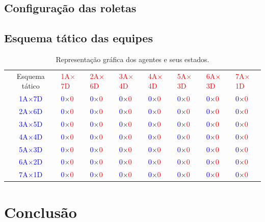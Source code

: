 \documentclass[preprint,12pt]{elsarticle}
\newcommand{\red}[1]{\textcolor{red}{#1}}
\newcommand{\blu}[1]{\textcolor{blue}{#1}}
\newcommand{\score}[2]{\blu{#1}$\times$\red{#2}}
\begin{document}
\subsection{Configuração das roletas}
\label{subsec:direcao_roletas}

\subsection{Esquema tático das equipes}
\label{subsec:esquema_tatico}

\begin{table}[H]
	\begin{center}
		\begin{tabular}{cp{1.15cm}p{1.15cm}p{1.15cm}p{1.15cm}p{1.15cm}p{1.15cm}p{1.15cm}}
			\toprule
			Esquema tático & \red{1A$\times$7D}  & \red{2A$\times$6D}  & \red{3A$\times$4D}  & \red{4A$\times$4D}  & \red{5A$\times$3D}  & \red{6A$\times$3D}  & \red{7A$\times$1D}\\
			\cmidrule(r){1-8}
			\blu{1A$\times$7D}    & \score{0}{0} & \score{0}{0} & \score{0}{0} & \score{0}{0} & \score{0}{0} & \score{0}{0} & \score{0}{0} \\
			\blu{2A$\times$6D}    & \score{0}{0} & \score{0}{0} & \score{0}{0} & \score{0}{0} & \score{0}{0} & \score{0}{0} & \score{0}{0} \\
			\blu{3A$\times$5D}    & \score{0}{0} & \score{0}{0} & \score{0}{0} & \score{0}{0} & \score{0}{0} & \score{0}{0} & \score{0}{0} \\
			\blu{4A$\times$4D}    & \score{0}{0} & \score{0}{0} & \score{0}{0} & \score{0}{0} & \score{0}{0} & \score{0}{0} & \score{0}{0} \\
			\blu{5A$\times$3D}    & \score{0}{0} & \score{0}{0} & \score{0}{0} & \score{0}{0} & \score{0}{0} & \score{0}{0} & \score{0}{0} \\
			\blu{6A$\times$2D}    & \score{0}{0} & \score{0}{0} & \score{0}{0} & \score{0}{0} & \score{0}{0} & \score{0}{0} & \score{0}{0} \\
			\blu{7A$\times$1D}    & \score{0}{0} & \score{0}{0} & \score{0}{0} & \score{0}{0} & \score{0}{0} & \score{0}{0} & \score{0}{0} \\

			\bottomrule
		\end{tabular}
		\caption{Representação gráfica dos agentes e seus estados.}
		\label{tbl:graphics}
	\end{center}
\end{table}


\section{Conclusão}
\label{sec:conclusao}
\end{document}
